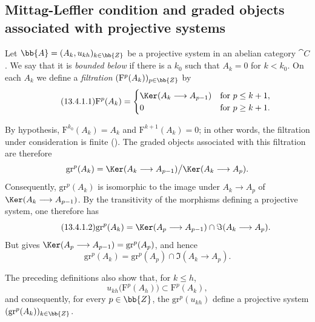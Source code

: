 \subsection{Mittag-Leffler condition and graded objects associated with projective systems}
\label{subsection:0.13.4}
\label{0.13.4}

\begin{env}[13.4.1]
\label{0.13.4.1}
Let
$\bb{A}=(A_k,u_{kh})_{k\in\bb{Z}}$ be a projective system in an
abelian category $\cat{C}$.
We say that it is \emph{bounded below} if there is a $k_0$ such that
$A_k=0$ for $k<k_0$.
On each $A_k$ we define a \emph{filtration}
$(\mathrm{F}^p(A_k))_{p\in\bb{Z}}$ by
\begin{equation}
\label{0.13.4.1.1}
\tag{13.4.1.1}
  \mathrm{F}^p(A_k)=
  \begin{cases}
    \Ker(A_k\longrightarrow A_{p-1}) & \text{for }p\leq k+1,\\
    0 & \text{for }p\geq k+1.
  \end{cases}
\end{equation}

By hypothesis,
$\mathrm{F}^{k_0}(A_k)=A_k$ and
$\mathrm{F}^{k+1}(A_k)=0$; in other words, the filtration under
consideration is finite ().
The graded objects associated with this filtration are therefore
\[
  \mathrm{gr}^p(A_k)
  =
  \Ker(A_k\longrightarrow A_{p-1})
  \big/
  \Ker(A_k\longrightarrow A_p).
\]
Consequently, $\mathrm{gr}^p(A_k)$ is isomorphic to the image under
$A_k\longrightarrow A_p$ of
$\Ker(A_k\longrightarrow A_{p-1})$.
By the transitivity of the morphisms defining a projective system,
one therefore has
\begin{equation}
\label{0.13.4.1.2}
\tag{13.4.1.2}
  \mathrm{gr}^p(A_k)
  =
  \Ker(A_p\longrightarrow A_{p-1})
  \cap
  \Im(A_k\longrightarrow A_p).
\end{equation}
But  gives
$\Ker(A_p\longrightarrow A_{p-1})=\mathrm{gr}^p(A_p)$, and hence
\begin{equation}
\label{0.13.4.1.3}
\tag{13.4.1.3}
  \mathrm{gr}^p(A_k)
  =
  \mathrm{gr}^p(A_p)
  \cap
  \Im(A_k\longrightarrow A_p).
\end{equation}

The preceding definitions also show that, for $k\leq h$,
\[
  u_{kh}\bigl(\mathrm{F}^p(A_h)\bigr)
  \subset
  \mathrm{F}^p(A_k),
\]
and consequently, for every $p\in\bb{Z}$, the
$\mathrm{gr}^p(u_{kh})$ define a projective system
$(\mathrm{gr}^p(A_k))_{k\in\bb{Z}}$.
\end{env}

